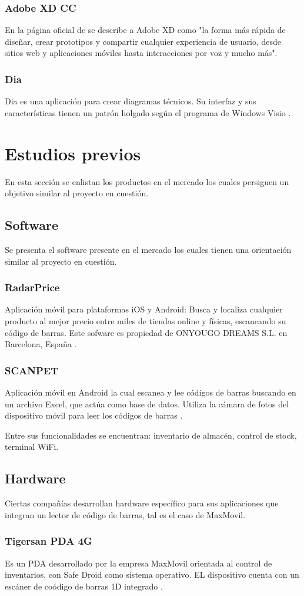 	\subsubsection{Adobe XD CC}
	En la página oficial de \textcite{Adobe} se describe a Adobe XD como "la forma más rápida de diseñar, crear prototipos y compartir cualquier experiencia de usuario, desde sitios web y aplicaciones móviles hasta interacciones por voz y mucho más".
	\subsubsection{Dia}
	Dia es una aplicación para crear diagramas técnicos. Su interfaz y sus características tienen un patrón holgado según el programa de Windows Visio \parencite{Dia}.

\section{Estudios previos}
	En esta sección se enlistan los productos en el mercado los cuales persiguen un objetivo similar al proyecto en cuestión.
	\subsection{Software}
		Se presenta el software presente en el mercado los cuales tienen una orientación similar al proyecto en cuestión.
		\subsubsection{RadarPrice}
		Aplicación móvil para plataformas iOS y Android: Busca y localiza cualquier producto al mejor precio entre miles de tiendas online y físicas, escaneando su código de barras. Este sofware es propiedad de ONYOUGO DREAMS S.L. en Barcelona, España \parencite{RadarPrice}.
		\subsubsection{SCANPET}
		Aplicación móvil en Android la cual escanea y lee códigos de barras buscando en un archivo Excel, que actúa como base de datos. Utiliza la cámara de fotos del dispositivo móvil para leer los códigos de barras \parencite{Domus}.
		
		Entre sus funcionalidades se encuentran: inventario de almacén, control de stock, terminal WiFi.
	\subsection{Hardware}
		Ciertas compañías desarrollan hardware específico para sus aplicaciones que integran un lector de código de barras, tal es el caso de MaxMovil.
		\subsubsection{Tigersan PDA 4G}
		Es un PDA desarrollado por la empresa MaxMovil orientada al control de inventarios, con Safe Droid como sistema operativo. EL dispositivo cuenta con un escáner de coódigo de barras 1D integrado \parencite{MaxMovil}.